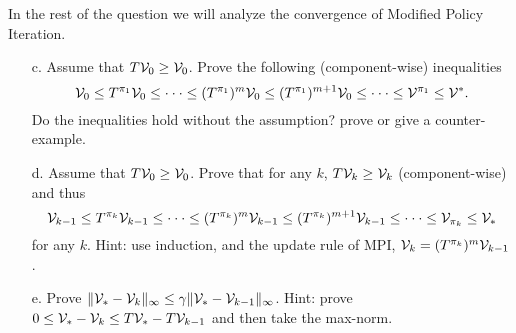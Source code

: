 In the rest of the question we will analyze the convergence of Modified Policy Iteration.
\begin{itemize}
\item [c.] Assume that $T \mathcal{V}_0\geq \mathcal{V}_0$. Prove the following (component-wise) inequalities $$\mathcal{V}_0\leq T^{\pi_1} \mathcal{V}_0 \leq \cdot\cdot\cdot \leq (T^{\pi_1})^m \mathcal{V}_0\leq (T^{\pi_1})^{m+1} \mathcal{V}_0 \leq \cdot \cdot \cdot \leq \mathcal{V}^{\pi_1} \leq \mathcal{V}^*.$$
Do the inequalities hold without the assumption? prove or give a counter-example.
\item [d.] Assume that $T \mathcal{V}_0\geq \mathcal{V}_0$. Prove that for any $k$, $T \mathcal{V}_k\geq \mathcal{V}_k$ (component-wise) and thus $$\mathcal{V}_{k-1}\leq T^{\pi_k}\mathcal{V}_{k-1} \leq \cdot\cdot\cdot \leq (T^{\pi_k})^m \mathcal{V}_{k-1} \leq (T^{\pi_k})^{m+1} \mathcal{V}_{k-1}\leq \cdot \cdot \cdot \leq \mathcal{V}_{\pi_{k}}\leq \mathcal{V}_*$$ for any $k$.
Hint: use induction, and the update rule of MPI, $\mathcal{V}_k=(T^{\pi_k})^m \mathcal{V}_{k-1}$.
\item [e.] Prove $\| {\mathcal{V}_*-\mathcal{V}_k} \|_\infty \leq \gamma \| {\mathcal{V}_*-\mathcal{V}_{k-1}} \|_\infty$. Hint: prove $0 \leq \mathcal{V}_*-\mathcal{V}_k\leq T\mathcal{V}_* - T\mathcal{V}_{k-1}$ and then take the max-norm.
\end{itemize}